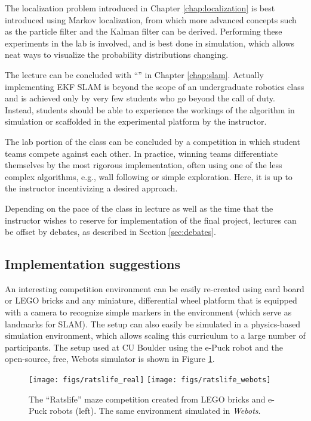The localization problem introduced in Chapter \ref{chap:localization} is best introduced using Markov localization, from which more advanced concepts such as the particle filter and the Kalman filter can be derived. Performing these experiments in the lab is involved, and is best done in simulation, which allows neat ways to visualize the probability distributions changing.

The lecture can be concluded with ``'' in Chapter \ref{chap:slam}. Actually implementing EKF SLAM is beyond the scope of an undergraduate robotics class and is achieved only by very few students who go beyond the call of duty. Instead, students should be able to experience the workings of the algorithm in simulation or scaffolded in the experimental platform by the instructor.

The lab portion of the class can be concluded by a competition in which student teams compete against each other. In practice, winning teams differentiate themselves by the most rigorous implementation, often using one of the less complex algorithms, e.g., wall following or simple exploration. Here, it is up to the instructor incentivizing a desired approach.

Depending on the pace of the class in lecture as well as the time that the instructor wishes to reserve for implementation of the final project, lectures can be offset by debates, as described in Section \ref{sec:debates}.

\subsection{Implementation suggestions}
An interesting competition environment can be easily re-created using card board or LEGO bricks and any miniature, differential wheel platform that is equipped with a camera to recognize simple markers in the environment (which serve as landmarks for SLAM). The setup can also easily be simulated in a physics-based simulation environment, which allows scaling this curriculum to a large number of participants. The setup used at CU Boulder using the e-Puck robot and the open-source, free, Webots simulator is shown in Figure \ref{fig:ratslifereal}.

\begin{figure}[htb]
\texttt{[image: figs/ratslife\_real]}
\texttt{[image: figs/ratslife\_webots]}
\caption{\label{fig:ratslifereal}The ``Ratslife'' maze competition created from LEGO bricks and e-Puck robots (left). The same environment simulated in \emph{Webots}.}
\end{figure}

